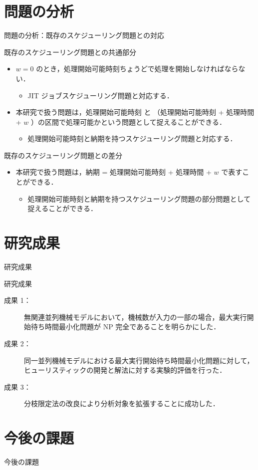 \documentclass[dvipdfmx]{beamer}
\begin{document}
\section{問題の分析}
\begin{frame}{問題の分析：既存のスケジューリング問題との対応}
  \begin{block}{既存のスケジューリング問題との共通部分}
    \begin{itemize}
      \item {$w = 0$ のとき，処理開始可能時刻ちょうどで処理を開始しなければならない．}
      \begin{itemize}
        \item {\alert{JIT ジョブスケジューリング問題}と対応する．}
      \end{itemize}
      \item {本研究で扱う問題は，処理開始可能時刻 と （処理開始可能時刻 + 処理時間 + $w$ ）の区間で処理可能かという問題として捉えることができる．}
      \begin{itemize}
        \item {\alert{処理開始可能時刻と納期を持つスケジューリング問題}と対応する．}
      \end{itemize}
    \end{itemize}
  \end{block}
  \begin{block}{既存のスケジューリング問題との差分}
    \begin{itemize}
      \item {本研究で扱う問題は，納期 = 処理開始可能時刻 + 処理時間 + $w$ で表すことができる．}
      \begin{itemize}
        \item {処理開始可能時刻と納期を持つスケジューリング問題の\alert{部分問題}として捉えることができる．}
      \end{itemize}
    \end{itemize}
  \end{block}
\end{frame}
\section{研究成果}
\begin{frame}{研究成果}
  \begin{block}{研究成果}
    \begin{description}
      \item[成果 1：] 無関連並列機械モデルにおいて，機械数が入力の一部の場合，最大実行開始待ち時間最小化問題が NP 完全であることを明らかにした．
      \item[成果 2：] 同一並列機械モデルにおける最大実行開始待ち時間最小化問題に対して，ヒューリスティックの開発と解法に対する実験的評価を行った．
      \item[成果 3：] 分枝限定法の改良により分析対象を拡張することに成功した．
    \end{description}
  \end{block}
\end{frame}
\section{今後の課題}
\begin{frame}{今後の課題}

\end{frame}
\end{document}
